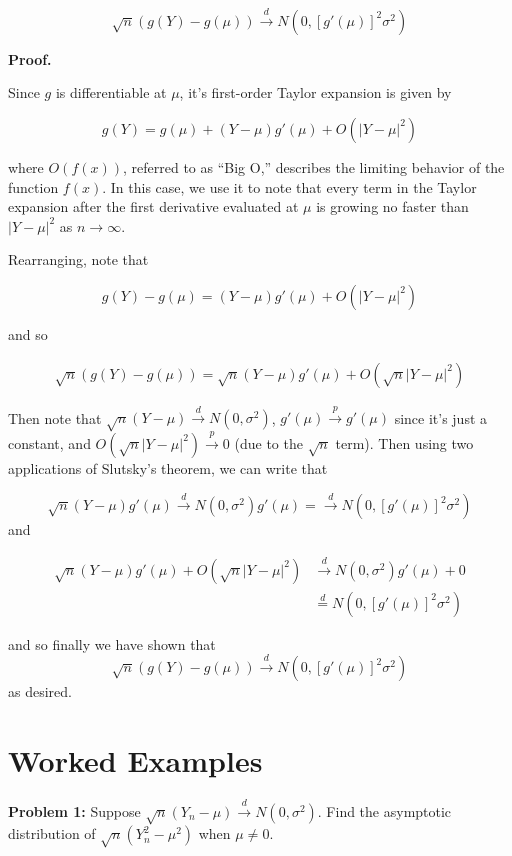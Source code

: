 \documentclass[
  letterpaper,
  DIV=11,
  numbers=noendperiod]{scrreprt}
\begin{document}
\[
\sqrt{n} \left( g(Y) - g(\mu)\right) \overset{d}{\to} N(0, [g'(\mu)]^2 \sigma^2)
\]

\textbf{Proof.}

Since \(g\) is differentiable at \(\mu\), it's first-order Taylor
expansion is given by

\[
g(Y) = g(\mu) + (Y - \mu)g'(\mu) + O(| Y - \mu |^2)
\]

where \(O(f(x))\), referred to as ``Big O,'' describes the limiting
behavior of the function \(f(x)\). In this case, we use it to note that
every term in the Taylor expansion after the first derivative evaluated
at \(\mu\) is growing no faster than \(|Y - \mu|^2\) as
\(n \to \infty\).

Rearranging, note that

\[
g(Y) - g(\mu) =  (Y - \mu)g'(\mu) + O(| Y - \mu |^2)
\]

and so

\begin{align*}
    \sqrt{n}\left( g(Y) - g(\mu) \right) = \sqrt{n}(Y - \mu) g'(\mu) + O(\sqrt{n} |Y - \mu|^2)
\end{align*}

Then note that \(\sqrt{n}(Y - \mu) \overset{d}{\to} N(0, \sigma^2)\),
\(g'(\mu) \overset{p}{\to} g'(\mu)\) since it's just a constant, and
\(O(\sqrt{n} |Y - \mu|^2) \overset{p}{\to} 0\) (due to the \(\sqrt{n}\)
term). Then using two applications of Slutsky's theorem, we can write
that

\[
\sqrt{n}(Y - \mu)g'(\mu) \overset{d}{\to} N(0, \sigma^2)g'(\mu) = \overset{d}{\to} N(0, [g'(\mu)]^2\sigma^2)
\] and

\begin{align*}
    \sqrt{n}(Y - \mu)g'(\mu) + O(\sqrt{n} |Y - \mu|^2) & \overset{d}{\to} N(0, \sigma^2)g'(\mu) + 0\\
    & \overset{d}{=} N(0, [g'(\mu)]^2\sigma^2) 
\end{align*}

and so finally we have shown that \[
\sqrt{n}\left( g(Y) - g(\mu) \right) \overset{d}{\to}  N(0, [g'(\mu)]^2\sigma^2)
\] as desired.

\hypertarget{worked-examples-5}{%
\section{Worked Examples}\label{worked-examples-5}}

\textbf{Problem 1:} Suppose
\(\sqrt{n}(Y_n - \mu) \overset{d}{\to} N(0, \sigma^2)\). Find the
asymptotic distribution of \(\sqrt{n}(Y_n^2 - \mu^2)\) when
\(\mu \neq 0\).
\end{document}
